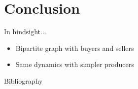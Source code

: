 \documentclass{beamer}
\begin{document}
\section{Conclusion}

\begin{frame}{In hindsight...}
    \begin{itemize} \setlength\itemsep{1.5em}
        \item Bipartite graph with buyers and sellers
        \item Same dynamics with simpler producers
    \end{itemize}
\end{frame}


\begin{frame}[allowframebreaks]{Bibliography}
    \printbibliography
\end{frame}
\end{document}

